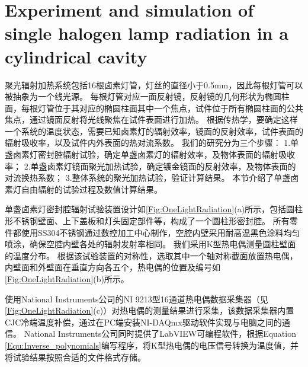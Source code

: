 \section{Experiment and simulation of single halogen lamp radiation in a cylindrical cavity}

聚光辐射加热系统包括16根卤素灯管，灯丝的直径小于0.5mm，因此每根灯管可以被抽象为一个线光源。
每根灯管对应一面反射镜，反射镜的几何形状为椭圆柱面，每根灯管位于其对应的椭圆柱面其中一个焦点，试件位于所有椭圆柱面的公共焦点，通过镜面反射将光线聚焦在试件表面进行加热。
根据传热学，要确定这样一个系统的温度状态，需要已知卤素灯的辐射效率，镜面的反射效率，试件表面的辐射吸收率，以及试件内外表面的热对流系数。
我们的研究分为三个步骤：
1.单盏卤素灯密封腔辐射试验，确定单盏卤素灯的辐射效率，及物体表面的辐射吸收率；
2.单盏卤素灯镜面聚光加热试验，确定镀金镜面的反射效率，及物体表面的对流换热系数；
3.整体系统的聚光加热试验，验证计算结果。
本节介绍了单盏卤素灯自由辐射的试验过程及数值计算结果。

单盏卤素灯密封腔辐射试验装置设计如\ref{Fig:OneLightRadiation}(a)所示，包括圆柱形不锈钢壁面、上下盖板和灯头固定部件等，构成了一个圆柱形密封腔。
所有零件都使用SS304不锈钢通过数控加工中心制作，空腔内壁采用耐高温黑色涂料均匀喷涂，确保空腔内壁各处的辐射发射率相同。
我们采用K型热电偶测量圆柱壁面的温度分布。
根据该试验装置的对称性，选取其中一个轴对称截面放置热电偶，内壁面和外壁面在垂直方向各五个，热电偶的位置及编号如\ref{Fig:OneLightRadiation}(b)所示。

使用National Instruments公司的NI 9213型16通道热电偶数据采集器（见\ref{Fig:OneLightRadiation}(c)）对热电偶的测量结果进行采集，该数据采集器内置CJC冷端温度补偿，通过在PC端安装NI-DAQmx驱动软件实现与电脑之间的通信。 National Instruments公司同时提供了LabVIEW可编程软件，根据Equation \ref{Equ:Inverse_polynomials}编写程序，将K型热电偶的电压信号转换为温度值，并将试验结果按照合适的文件格式存储。


